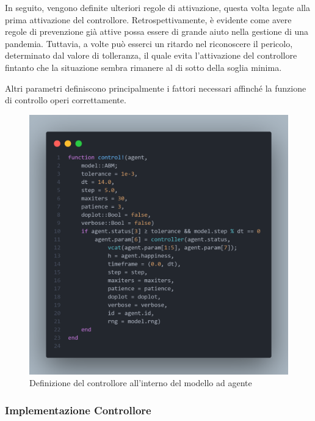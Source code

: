 In seguito, vengono definite ulteriori regole di attivazione, 
questa volta legate alla prima attivazione del controllore. 
Retrospettivamente, è evidente come avere regole di prevenzione 
già attive possa essere di grande aiuto nella gestione di una pandemia. 
Tuttavia, a volte può esserci un ritardo nel riconoscere il pericolo, 
determinato dal valore di tolleranza, il quale evita l'attivazione 
del controllore fintanto che la situazione sembra rimanere al di sotto 
della soglia minima.

Altri parametri definiscono principalmente i fattori necessari affinché 
la funzione di controllo operi correttamente.

\begin{figure}[H]
    \begin{center}
		\includegraphics[width=\textwidth]{img/controller_neuralode.png}
		\caption{Definizione del controllore all'interno del modello ad agente}
		\label{fig:controller_abm}
	\end{center}
\end{figure}
 
\newpage

\subsubsection{Implementazione Controllore}

